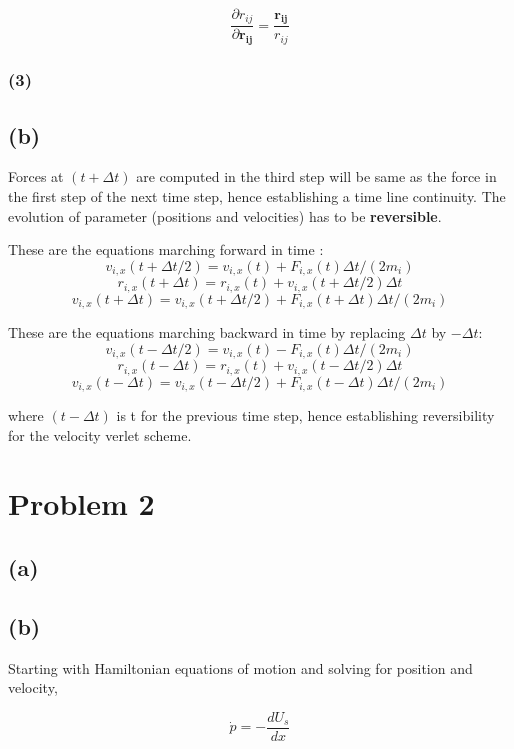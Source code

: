 \documentclass{article}
\begin{document}
\begin{equation}
\boxed{ \frac{\partial r_{ij}}{\partial \boldsymbol{r_{ij}}} = \frac{\boldsymbol{r_{ij}}}{r_{ij}} }
\end{equation}

\subsubsection{(3)}
\label{sec-1-1-3}

\subsection{(b)}
\label{sec-1-2}
Forces at $(t+\Delta t)$ are computed in the third step will be same as the force in the first step of the next time step, hence establishing a time line continuity. The evolution of parameter (positions and velocities) has to be \textbf{reversible}.

These are the equations marching forward in time :
$$ v_{i,x}(t+\Delta t/2) = v_{i,x}(t) + F_{i,x}(t)\Delta t/(2m_{i})$$
$$ r_{i,x}(t+\Delta t) = r_{i,x}(t) + v_{i,x}(t+\Delta t/2)\Delta t $$
$$ v_{i,x}(t+\Delta t) = v_{i,x}(t+\Delta t/2) + F_{i,x}(t+\Delta t)\Delta t/(2m_{i}) $$


These are the equations marching backward in time by replacing $\Delta t$ by $-\Delta t$:
$$ v_{i,x}(t-\Delta t/2) = v_{i,x}(t) - F_{i,x}(t)\Delta t/(2m_{i})$$
$$ r_{i,x}(t-\Delta t) = r_{i,x}(t) + v_{i,x}(t-\Delta t/2)\Delta t $$
$$ v_{i,x}(t-\Delta t) = v_{i,x}(t-\Delta t/2) + F_{i,x}(t-\Delta t)\Delta t/(2m_{i}) $$

where $(t-\Delta t)$ is t for the previous time step, hence establishing reversibility for the velocity verlet scheme.

\section{Problem 2}
\label{sec-2}
\subsection{(a)}
\label{sec-2-1}
\subsection{(b)}
\label{sec-2-2}
Starting with Hamiltonian equations of motion and solving for position and velocity,

\begin{equation}
\dot{p} = -\frac{dU_{s}}{dx}
\end{equation}
\end{document}
